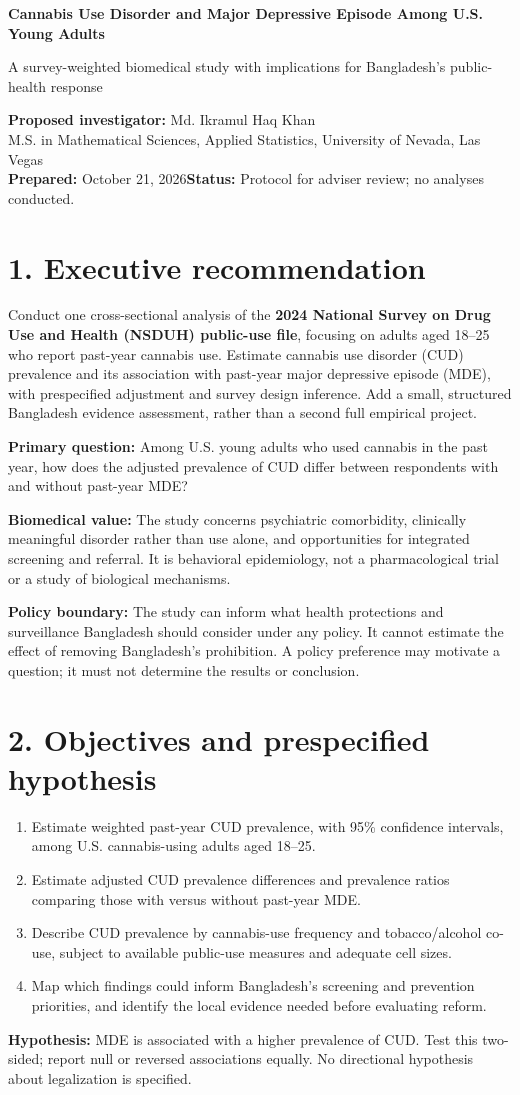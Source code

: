 \documentclass[10pt]{article}
\newcommand{\head}[1]{\section*{\color{navy}#1}}
\begin{document}
{\Large\bfseries\color{navy} Cannabis Use Disorder and Major Depressive Episode Among U.S. Young Adults}\par
{\large A survey-weighted biomedical study with implications for Bangladesh's public-health response}\par
\textbf{Proposed investigator:} Md. Ikramul Haq Khan\\
M.S. in Mathematical Sciences, Applied Statistics, University of Nevada, Las Vegas\\
\textbf{Prepared:} October 21, 2026\quad\textbf{Status:} Protocol for adviser review; no analyses conducted.
\head{1. Executive recommendation}
Conduct one cross-sectional analysis of the \textbf{2024 National Survey on Drug Use and Health (NSDUH) public-use file}, focusing on adults aged 18--25 who report past-year cannabis use. Estimate cannabis use disorder (CUD) prevalence and its association with past-year major depressive episode (MDE), with prespecified adjustment and survey design inference. Add a small, structured Bangladesh evidence assessment, rather than a second full empirical project.

\textbf{Primary question:} Among U.S. young adults who used cannabis in the past year, how does the adjusted prevalence of CUD differ between respondents with and without past-year MDE?

\textbf{Biomedical value:} The study concerns psychiatric comorbidity, clinically meaningful disorder rather than use alone, and opportunities for integrated screening and referral. It is behavioral epidemiology, not a pharmacological trial or a study of biological mechanisms.

\textbf{Policy boundary:} The study can inform what health protections and surveillance Bangladesh should consider under any policy. It cannot estimate the effect of removing Bangladesh's prohibition. A policy preference may motivate a question; it must not determine the results or conclusion.
\head{2. Objectives and prespecified hypothesis}
\begin{enumerate}
\item Estimate weighted past-year CUD prevalence, with 95\% confidence intervals, among U.S. cannabis-using adults aged 18--25.
\item Estimate adjusted CUD prevalence differences and prevalence ratios comparing those with versus without past-year MDE.
\item Describe CUD prevalence by cannabis-use frequency and tobacco/alcohol co-use, subject to available public-use measures and adequate cell sizes.
\item Map which findings could inform Bangladesh's screening and prevention priorities, and identify the local evidence needed before evaluating reform.
\end{enumerate}
\textbf{Hypothesis:} MDE is associated with a higher prevalence of CUD. Test this two-sided; report null or reversed associations equally. No directional hypothesis about legalization is specified.
\end{document}
